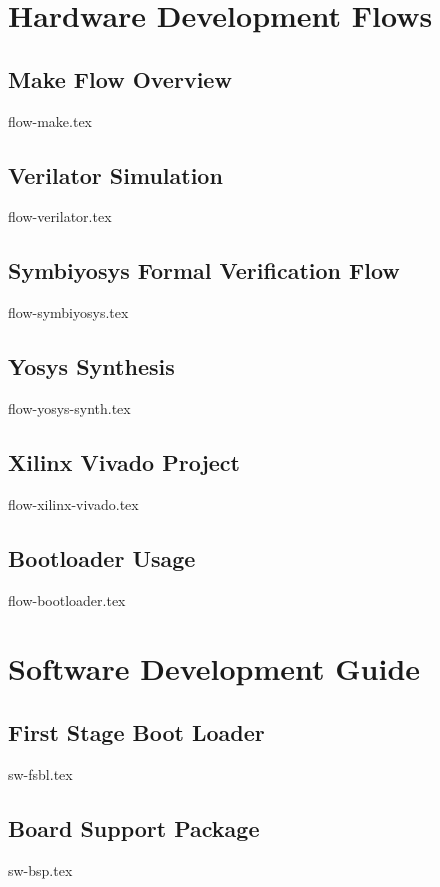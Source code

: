 \documentclass{scarv-report}
\begin{document}
\section{Hardware Development Flows}

\subsection{Make Flow Overview}
{flow-make.tex}

\subsection{Verilator Simulation}
{flow-verilator.tex}

\subsection{Symbiyosys Formal Verification Flow}
{flow-symbiyosys.tex}

\subsection{Yosys Synthesis}
{flow-yosys-synth.tex}

\subsection{Xilinx Vivado Project}
{flow-xilinx-vivado.tex}

\subsection{Bootloader Usage}
{flow-bootloader.tex}

\section{Software Development Guide}

\subsection{First Stage Boot Loader}
{sw-fsbl.tex}

\subsection{Board Support Package}
{sw-bsp.tex}
\end{document}
